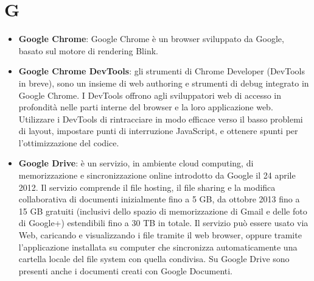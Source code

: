 \section{G}
\begin{itemize}
	\item
	\textbf{Google Chrome}: Google Chrome è un browser sviluppato da Google, basato sul motore di rendering Blink.
	\item
	\textbf{Google Chrome DevTools}: gli strumenti di Chrome Developer (DevTools in breve), sono un insieme di web authoring e strumenti di debug integrato in Google Chrome. I DevTools offrono agli sviluppatori web di accesso in profondità nelle parti interne del browser e la loro applicazione web. Utilizzare i DevTools di rintracciare in modo efficace verso il basso problemi di layout, impostare punti di interruzione JavaScript, e ottenere spunti per l'ottimizzazione del codice.
	\item
	\textbf{Google Drive}: è un servizio, in ambiente cloud computing, di memorizzazione e sincronizzazione online introdotto da Google il 24 aprile 2012. Il servizio comprende il file hosting, il file sharing e la modifica collaborativa di documenti inizialmente fino a 5 GB, da ottobre 2013 fino a 15 GB gratuiti (inclusivi dello spazio di memorizzazione di Gmail e delle foto di Google+) estendibili fino a 30 TB in totale. Il servizio può essere usato via Web, caricando e visualizzando i file tramite il web browser, oppure tramite l'applicazione installata su computer che sincronizza automaticamente una cartella locale del file system con quella condivisa. Su Google Drive sono presenti anche i documenti creati con Google Documenti.
\end{itemize}
